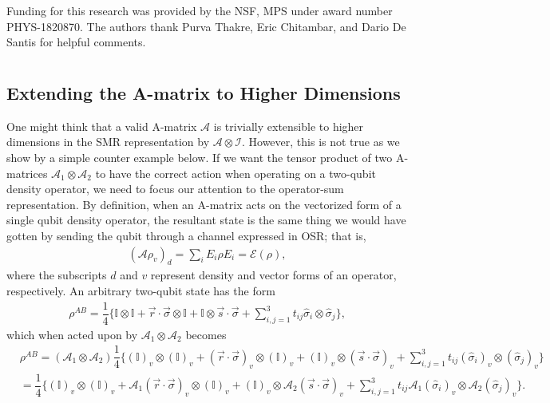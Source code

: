 \documentclass[12pt]{iopart}
\begin{document}
Funding for this research was provided by the NSF, MPS under award number PHYS-1820870.  The authors thank Purva Thakre, Eric Chitambar, and Dario De Santis for helpful comments.  


\appendix

\section{}

\subsection{Extending the A-matrix to Higher Dimensions}
\label{Sec:extendingA-matrix}

One might think that a valid A-matrix $\mathcal{A}$ is trivially extensible to higher dimensions in the SMR representation by $\mathcal{A}\otimes \mathcal{I}$. However, this is not true as we show by a simple counter example below. If we want the tensor product of two A-matrices $\mathcal{A}_1 \otimes \mathcal{A}_2$ to have the correct action when operating on a two-qubit density operator, we need to focus our attention to the operator-sum representation. By definition, when an A-matrix acts on the vectorized form of a single qubit density operator, the resultant state is the same thing we would have gotten by sending the qubit through a channel expressed in OSR; that is,
\begin{align}\label{Eq:Qubit_vectoized}
    (\mathcal{A} \rho_v)_d = \sum_i E_i \rho E_i = \mathcal{E}(\rho),
\end{align}
where the subscripts $d$ and $v$ represent density and vector forms of an operator, respectively. An arbitrary two-qubit state has the form
\begin{align}
    \rho^{AB} = \dfrac{1}{4} \bigg\{ \mathbb{I} \otimes \mathbb{I} + \vec{r} \cdot \vec{\sigma} \otimes \mathbb{I} + \mathbb{I} \otimes \vec{s} \cdot \vec{\sigma} + \sum_{i,j=1}^3 t_{ij} \hat{\sigma}_i \otimes \hat{\sigma}_j \bigg\},
\end{align}
which when acted upon by $\mathcal{A}_1 \otimes \mathcal{A}_2$ becomes
\begin{align}
    &\rho^{AB} = (\mathcal{A}_1 \otimes \mathcal{A}_2) \dfrac{1}{4} \bigg\{ (\mathbb{I})_v \otimes (\mathbb{I})_v + (\vec{r} \cdot \vec{\sigma})_v \otimes (\mathbb{I} )_v+ (\mathbb{I})_v \otimes (\vec{s} \cdot \vec{\sigma})_v + \sum_{i,j=1}^3 t_{ij} (\hat{\sigma}_i)_v \otimes (\hat{\sigma}_j)_v \bigg\} \\
    &= \dfrac{1}{4} \bigg\{ (\mathbb{I})_v \otimes (\mathbb{I})_v + \mathcal{A}_1 (\vec{r} \cdot \vec{\sigma})_v \otimes (\mathbb{I} )_v+ (\mathbb{I})_v \otimes \mathcal{A}_2 (\vec{s} \cdot \vec{\sigma})_v + \sum_{i,j=1}^3 t_{ij} \mathcal{A}_1 (\hat{\sigma}_i)_v \otimes \mathcal{A}_2 (\hat{\sigma}_j)_v \bigg\}. \nonumber
\end{align}
\end{document}
